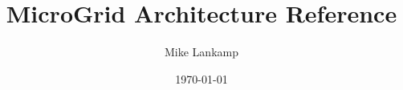\documentclass[twoside,openright,a4paper]{book}
\author{Mike Lankamp}
\title{MicroGrid Architecture Reference}
\date{\today}
\begin{document}
\maketitle
\tableofcontents















\renewcommand{\bibname}{References}


\end{document}
